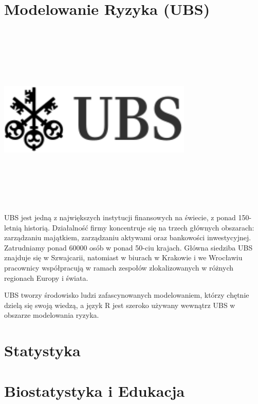 \documentclass[11pt,twoside,b5paper]{book}
\begin{document}
\section{Modelowanie Ryzyka (UBS)}
\\ \ \\ \ \\ \ \\ \ \\ 
\begin{minipage}[t]{0.915\textwidth}
	\center     
    \includegraphics[width=350px]{img/ubs.png} 
\end{minipage}
\\ \ \\ \ \\ \ \\ \ \\ 
UBS jest jedną z największych instytucji finansowych na świecie, z ponad 150-letnią historią. Działalność firmy koncentruje się na trzech głównych obszarach: zarządzaniu majątkiem, zarządzaniu aktywami oraz bankowości inwestycyjnej. Zatrudniamy ponad 60000 osób w ponad 50-ciu krajach. Główna siedziba UBS znajduje się w Szwajcarii, natomiast w biurach w Krakowie i we Wrocławiu pracownicy współpracują w ramach zespołów zlokalizowanych w różnych regionach Europy i świata.

UBS tworzy środowisko ludzi zafascynowanych modelowaniem, którzy chętnie dzielą się swoją wiedzą, a język R jest szeroko używany wewnątrz UBS w obszarze modelowania ryzyka.
\newpage


\newpage
\section{Statystyka}





\newpage
\section{Biostatystyka i Edukacja}





\newpage
\end{document}
